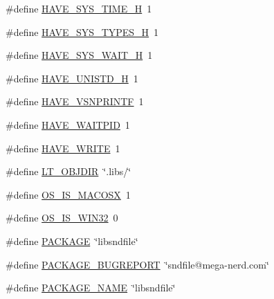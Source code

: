 \begin{DoxyCompactItemize}
\#define \hyperlink{mac_2config_2i386_2lib-src_2libsndfile_2src_2config_8h_a2aae46056558e9d6fef6380f9678ffe3}{H\+A\+V\+E\+\_\+\+S\+Y\+S\+\_\+\+T\+I\+M\+E\+\_\+H}~1
\item 
\#define \hyperlink{mac_2config_2i386_2lib-src_2libsndfile_2src_2config_8h_a69dc70bea5d1f8bd2be9740e974fa666}{H\+A\+V\+E\+\_\+\+S\+Y\+S\+\_\+\+T\+Y\+P\+E\+S\+\_\+H}~1
\item 
\#define \hyperlink{mac_2config_2i386_2lib-src_2libsndfile_2src_2config_8h_af249315f5939884ce5b4585ca81a1e39}{H\+A\+V\+E\+\_\+\+S\+Y\+S\+\_\+\+W\+A\+I\+T\+\_\+H}~1
\item 
\#define \hyperlink{mac_2config_2i386_2lib-src_2libsndfile_2src_2config_8h_a219b06937831d0da94d801ab13987639}{H\+A\+V\+E\+\_\+\+U\+N\+I\+S\+T\+D\+\_\+H}~1
\item 
\#define \hyperlink{mac_2config_2i386_2lib-src_2libsndfile_2src_2config_8h_a4ac6a60cb19181437136206238f16497}{H\+A\+V\+E\+\_\+\+V\+S\+N\+P\+R\+I\+N\+TF}~1
\item 
\#define \hyperlink{mac_2config_2i386_2lib-src_2libsndfile_2src_2config_8h_a9196ec9c05152e1058c8a20a5ffd3f1a}{H\+A\+V\+E\+\_\+\+W\+A\+I\+T\+P\+ID}~1
\item 
\#define \hyperlink{mac_2config_2i386_2lib-src_2libsndfile_2src_2config_8h_a14414f763b791f533c55cb63db64bcbd}{H\+A\+V\+E\+\_\+\+W\+R\+I\+TE}~1
\item 
\#define \hyperlink{mac_2config_2i386_2lib-src_2libsndfile_2src_2config_8h_ac2d5925d76379847dd9fc4747b061659}{L\+T\+\_\+\+O\+B\+J\+D\+IR}~\char`\"{}.libs/\char`\"{}
\item 
\#define \hyperlink{mac_2config_2i386_2lib-src_2libsndfile_2src_2config_8h_a0ae3ece9c5b88473973368cad7962b7c}{O\+S\+\_\+\+I\+S\+\_\+\+M\+A\+C\+O\+SX}~1
\item 
\#define \hyperlink{mac_2config_2i386_2lib-src_2libsndfile_2src_2config_8h_af55358e6ac739139d0848fe3c64bd878}{O\+S\+\_\+\+I\+S\+\_\+\+W\+I\+N32}~0
\item 
\#define \hyperlink{mac_2config_2i386_2lib-src_2libsndfile_2src_2config_8h_aca8570fb706c81df371b7f9bc454ae03}{P\+A\+C\+K\+A\+GE}~\char`\"{}libsndfile\char`\"{}
\item 
\#define \hyperlink{mac_2config_2i386_2lib-src_2libsndfile_2src_2config_8h_a1d1d2d7f8d2f95b376954d649ab03233}{P\+A\+C\+K\+A\+G\+E\+\_\+\+B\+U\+G\+R\+E\+P\+O\+RT}~\char`\"{}sndfile@mega-\/nerd.\+com\char`\"{}
\item 
\#define \hyperlink{mac_2config_2i386_2lib-src_2libsndfile_2src_2config_8h_a1c0439e4355794c09b64274849eb0279}{P\+A\+C\+K\+A\+G\+E\+\_\+\+N\+A\+ME}~\char`\"{}libsndfile\char`\"{}

\end{DoxyCompactItemize}
